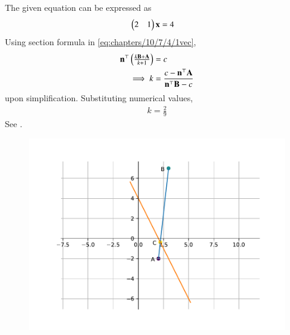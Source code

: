 The given equation can be expressed as
\begin{align}
\label{eq:chapters/10/7/4/1vec}
    \begin{pmatrix}2&1\end{pmatrix}\mathbf{x}&=4
\end{align}
Using section formula in
\eqref{eq:chapters/10/7/4/1vec},
\begin{align}
    \mathbf{n}^{\top}\begin{pmatrix}\frac{k\mathbf{B+A}}{k+1}\end{pmatrix}&=c\\
    \implies k&=\frac{c-\mathbf{n}^{\top}\mathbf{A}}{\mathbf{n}^{\top}\mathbf{B}-c}
\end{align}
upon simplification.  Substituting numerical values, 
\begin{align}
    k=\frac{2}{9}
\end{align}
See 
.
\begin{figure}[H]
\centering
\includegraphics[width=0.75\columnwidth]{chapters/10/7/4/1/figs/fig.pdf}
\caption{}
\label{fig:chapters/10/7/4/1vec}
\end{figure}

